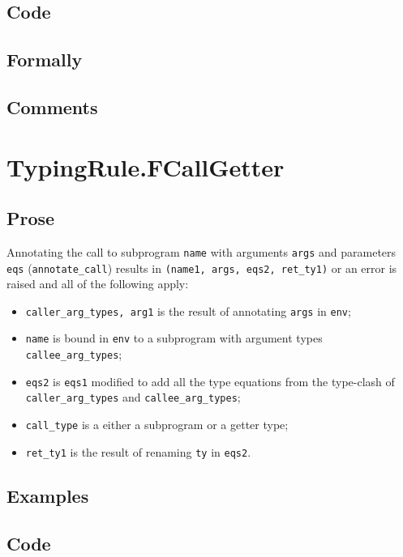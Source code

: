 \documentclass{book}
\begin{document}
  \subsection{Code}

  \subsection{Formally}

  \subsection{Comments}

\section{TypingRule.FCallGetter \label{sec:TypingRule.FCallGetter}}

  \subsection{Prose}
  Annotating the call to subprogram \texttt{name} with arguments \texttt{args}
and parameters \texttt{eqs} (\texttt{annotate\_call}) results in
\texttt{(name1, args, eqs2, ret\_ty1)} or an error is raised and all of the following apply:
   \begin{itemize}
   \item \texttt{caller\_arg\_types, arg1} is the result of annotating \texttt{args} in \texttt{env};
   \item \texttt{name} is bound in \texttt{env} to a subprogram with argument types
      \texttt{callee\_arg\_types};
   \item \texttt{eqs2} is \texttt{eqs1} modified to add all the type equations from the
      type-clash of \texttt{caller\_arg\_types} and \texttt{callee\_arg\_types};
   \item \texttt{call\_type} is a either a subprogram or a getter type;
   \item \texttt{ret\_ty1} is the result of renaming \texttt{ty} in \texttt{eqs2}.
   \end{itemize}

  \subsection{Examples}

  \subsection{Code}
\end{document}
